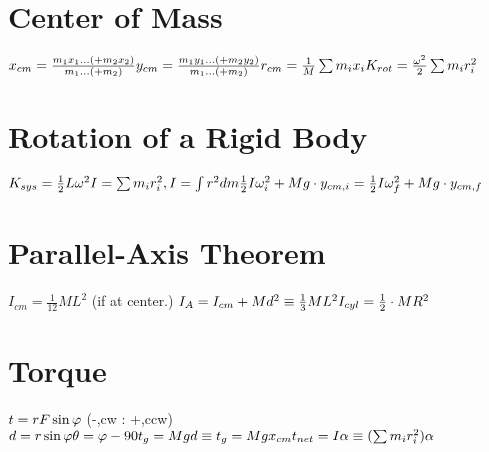 \documentclass[11pt]{article}
\begin{document}
\begin{paracol}{3}
        \section*{Center of Mass}
        \begin{fleqn}
            $
            x_{cm} = \frac{m_1x_1...(+m_2x_2)}{m_1...(+m_2)} \newline
            y_{cm} = \frac{m_1y_1...(+m_2y_2)}{m_1...(+m_2)} \newline
            r_{cm} = \frac1M \sum m_{i}x_i \newline
            K_{rot} = \frac{\omega^2}{2}\sum m_i r_i^2
            $
        \end{fleqn}
        \section*{Rotation of a Rigid Body}
        \begin{fleqn}
            $
            K_{sys} = \frac12 L \omega^2 \newline
            I = \sum m_{i} r_i^2, I = \int r^2 dm \newline
            \frac12 I \omega_i^2 + Mg\cdot y_{cm,i} = \frac 12 I \omega_f^2 + Mg\cdot y_{cm,f} \newline
            $
        \end{fleqn}
        \section*{Parallel-Axis Theorem}
        \begin{fleqn}
            $
            I_{cm} = \frac{1}{12} ML^2 $ (if at center.) $ \newline
            I_A = I_{cm} + Md^2 \equiv \frac13 ML^2 \newline
            I_{cyl} = \frac12 \cdot MR^2
            $
        \end{fleqn}
        \section*{Torque}
        \begin{fleqn}
            $
            t = rF \sin\varphi \newline $ (-,cw : +,ccw)$ \newline
            d = r \sin\varphi \newline
            \theta = \varphi - 90 \newline
            t_g = Mgd \equiv t_g = Mgx_{cm} \newline
            t_{net} = I\alpha \equiv (\sum m_i r_i^2)\alpha \newline
            $
        \end{fleqn}

\end{paracol}
\end{document}
